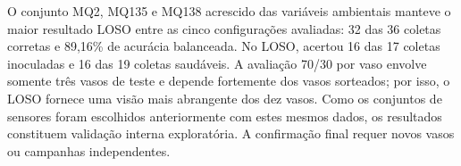 O conjunto MQ2, MQ135 e MQ138 acrescido das variáveis ambientais manteve o
maior resultado LOSO entre as cinco configurações avaliadas: 32 das 36
coletas corretas e 89,16\% de acurácia balanceada. No LOSO, acertou 16 das
17 coletas inoculadas e 16 das 19 coletas saudáveis. A avaliação 70/30 por
vaso envolve somente três vasos de teste e depende fortemente dos vasos
sorteados; por isso, o LOSO fornece uma visão mais abrangente dos dez vasos.
Como os conjuntos de sensores foram escolhidos anteriormente com estes mesmos
dados, os resultados constituem validação interna exploratória. A confirmação
final requer novos vasos ou campanhas independentes.
